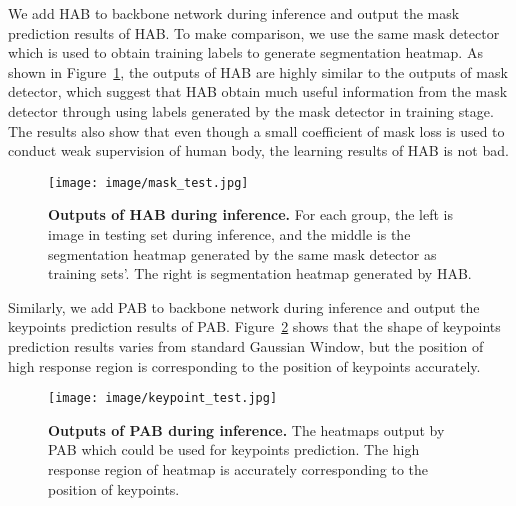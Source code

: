 \documentclass[10pt,twocolumn,letterpaper]{article}
\begin{document}
We add HAB to backbone network during inference and output the mask prediction results of HAB. To make comparison, we use the same mask detector which is used to obtain training labels to generate segmentation heatmap. As shown in Figure~\ref{image:mask_test}, the outputs of HAB are highly similar to the outputs of mask detector, which suggest that HAB obtain much useful information from the mask detector through using labels generated by the mask detector in training stage. The results also show that even though a small coefficient of mask loss is used to conduct weak supervision of human body, the learning results of HAB is not bad.

\begin{figure}[htbp]
	\begin{center}
		\begin{minipage}[t]{0.9\linewidth}
			\vspace{-1mm}
\texttt{[image: image/mask\_test.jpg]}
		\end{minipage}
	\end{center}
	\vspace{-1mm}
	\caption{\textbf{Outputs of HAB during inference.} For each group, the left is image in testing set during inference, and the middle is the segmentation heatmap generated by the same mask detector as training sets'. The right is segmentation heatmap generated by HAB.
	}
	\label{image:mask_test}
\end{figure}

Similarly, we add PAB to backbone network during inference and output the keypoints prediction results of PAB. Figure~\ref{image:keypoint_test} shows that the shape of keypoints prediction results varies from standard Gaussian Window, but the position of high response region is corresponding to the position of keypoints accurately.

\begin{figure}[htbp]
	\begin{center}
		\begin{minipage}[t]{1.0\linewidth}
			\vspace{-1mm}
\texttt{[image: image/keypoint\_test.jpg]}
		\end{minipage}
	\end{center}
	\vspace{-1mm}
	\caption{\textbf{Outputs of PAB during inference.} The heatmaps output by PAB which could be used for keypoints prediction. The high response region of heatmap is accurately corresponding to the position of keypoints.
	}
	\label{image:keypoint_test}
\end{figure}
\end{document}
